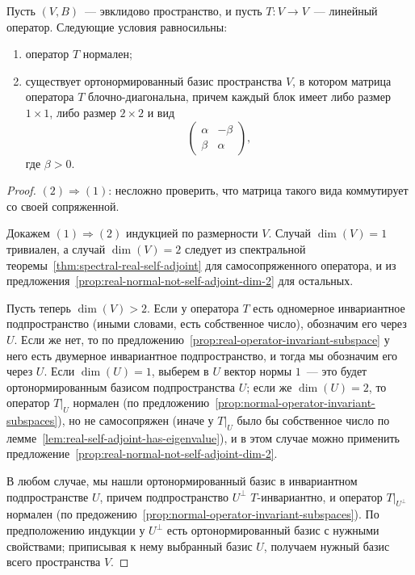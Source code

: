 \begin{theorem}\label{thm:spectral-euclidean}
Пусть $(V,B)$~--- эвклидово пространство, и пусть $T\colon V\to V$~---
линейный оператор.
Следующие условия равносильны:
\begin{enumerate}
\item оператор $T$ нормален;
\item существует ортонормированный базис пространства $V$, в котором
матрица оператора $T$ блочно-диагональна, причем каждый блок имеет
либо размер $1\times 1$, либо размер $2\times 2$ и вид
$$
\begin{pmatrix} \alpha & -\beta \\ \beta & \alpha\end{pmatrix},
$$
где $\beta > 0$.
\end{enumerate}
\end{theorem}
\begin{proof}
$(2)\Rightarrow (1)$: несложно проверить, что матрица такого вида
коммутирует со своей сопряженной.

Докажем $(1)\Rightarrow (2)$ индукцией по размерности $V$.
Случай $\dim(V)=1$ тривиален, а случай $\dim(V) = 2$ следует из
спектральной теоремы~\ref{thm:spectral-real-self-adjoint} для
самосопряженного оператора, и из
предложения~\ref{prop:real-normal-not-self-adjoint-dim-2}
для остальных.

Пусть теперь $\dim(V) > 2$.
Если у оператора $T$ есть одномерное инвариантное подпространство
(иными словами, есть собственное число), обозначим его через $U$.
Если же нет, то 
по предложению~\ref{prop:real-operator-invariant-subspace} у него
есть двумерное инвариантное подпространство, и тогда мы обозначим его
через $U$.
Если $\dim(U) = 1$, выберем в $U$ вектор нормы $1$~--- это будет
ортонормированным базисом подпространства $U$; если же $\dim(U) = 2$,
то оператор $T|_U$ нормален
(по предложению~\ref{prop:normal-operator-invariant-subspaces}), но не
самосопряжен (иначе у $T|_U$ было бы собственное число
по лемме~\ref{lem:real-self-adjoint-has-eigenvalue}), и в этом случае
можно применить
предложение~\ref{prop:real-normal-not-self-adjoint-dim-2}.

В любом случае, мы нашли ортонормированный базис в инвариантном
подпространстве $U$, причем подпространство $U^\perp$ $T$-инвариантно,
и оператор $T|_{U^\perp}$ нормален
(по предожению~\ref{prop:normal-operator-invariant-subspaces}).
По предположению индукции у $U^\perp$ есть ортонормированный базис с
нужными свойствами; приписывая к нему выбранный базис $U$,
получаем нужный базис всего пространства $V$.
\end{proof}


